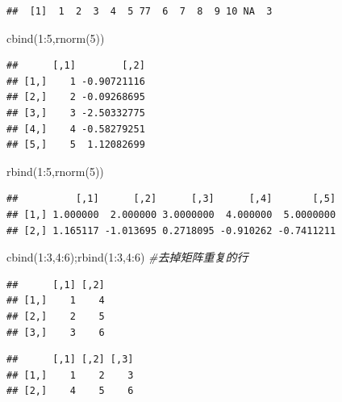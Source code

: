 \documentclass[
]{book}
\newenvironment{Shaded}{\begin{snugshade}}{\end{snugshade}}
\newcommand{\CommentTok}[1]{\textcolor[rgb]{0.56,0.35,0.01}{\textit{#1}}}
\newcommand{\DecValTok}[1]{\textcolor[rgb]{0.00,0.00,0.81}{#1}}
\newcommand{\FunctionTok}[1]{\textcolor[rgb]{0.00,0.00,0.00}{#1}}
\newcommand{\NormalTok}[1]{#1}
\newcommand{\SpecialCharTok}[1]{\textcolor[rgb]{0.00,0.00,0.00}{#1}}
\begin{document}
\begin{verbatim}
##  [1]  1  2  3  4  5 77  6  7  8  9 10 NA  3
\end{verbatim}

\begin{Shaded}
\begin{Highlighting}[]
\FunctionTok{cbind}\NormalTok{(}\DecValTok{1}\SpecialCharTok{:}\DecValTok{5}\NormalTok{,}\FunctionTok{rnorm}\NormalTok{(}\DecValTok{5}\NormalTok{))}
\end{Highlighting}
\end{Shaded}

\begin{verbatim}
##      [,1]        [,2]
## [1,]    1 -0.90721116
## [2,]    2 -0.09268695
## [3,]    3 -2.50332775
## [4,]    4 -0.58279251
## [5,]    5  1.12082699
\end{verbatim}

\begin{Shaded}
\begin{Highlighting}[]
\FunctionTok{rbind}\NormalTok{(}\DecValTok{1}\SpecialCharTok{:}\DecValTok{5}\NormalTok{,}\FunctionTok{rnorm}\NormalTok{(}\DecValTok{5}\NormalTok{))}
\end{Highlighting}
\end{Shaded}

\begin{verbatim}
##          [,1]      [,2]      [,3]      [,4]       [,5]
## [1,] 1.000000  2.000000 3.0000000  4.000000  5.0000000
## [2,] 1.165117 -1.013695 0.2718095 -0.910262 -0.7411211
\end{verbatim}

\begin{Shaded}
\begin{Highlighting}[]
\FunctionTok{cbind}\NormalTok{(}\DecValTok{1}\SpecialCharTok{:}\DecValTok{3}\NormalTok{,}\DecValTok{4}\SpecialCharTok{:}\DecValTok{6}\NormalTok{);}\FunctionTok{rbind}\NormalTok{(}\DecValTok{1}\SpecialCharTok{:}\DecValTok{3}\NormalTok{,}\DecValTok{4}\SpecialCharTok{:}\DecValTok{6}\NormalTok{) }\CommentTok{\#去掉矩阵重复的行}
\end{Highlighting}
\end{Shaded}

\begin{verbatim}
##      [,1] [,2]
## [1,]    1    4
## [2,]    2    5
## [3,]    3    6
\end{verbatim}

\begin{verbatim}
##      [,1] [,2] [,3]
## [1,]    1    2    3
## [2,]    4    5    6
\end{verbatim}
\end{document}
